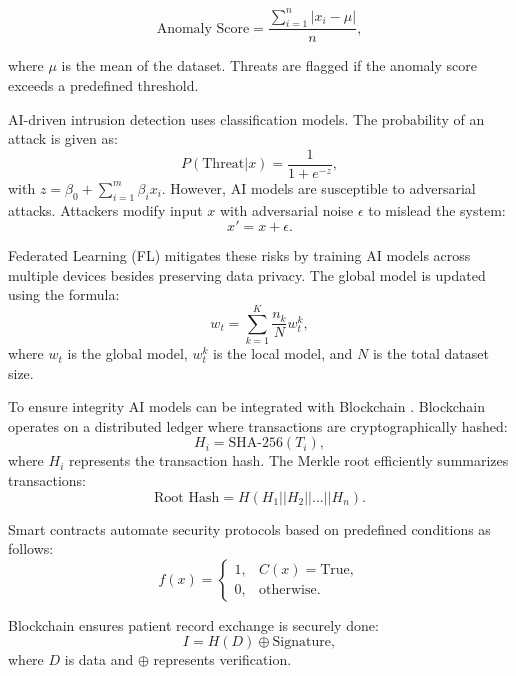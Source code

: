 \documentclass[pdflatex,sn-mathphys-num]{sn-jnl}
\theoremstyle{thmstyleone}%
\theoremstyle{thmstyletwo}%
\theoremstyle{thmstylethree}%
\begin{document}
\begin{equation}
\text{Anomaly Score} = \frac{\sum_{i=1}^n |x_i - \mu|}{n}, 
\end{equation}


where \(\mu\) is the mean of the dataset. Threats are flagged if the anomaly score exceeds a predefined threshold.

AI-driven intrusion detection uses classification models. The probability of an attack is given as:
\begin{equation}
P(\text{Threat} | x) = \frac{1}{1 + e^{-z}}, 
\end{equation}
with \(z = \beta_0 + \sum_{i=1}^m \beta_i x_i\). However, AI models are susceptible to adversarial attacks. Attackers modify input \(x\) with adversarial noise \(\epsilon\) to mislead the system:
\begin{equation}
x' = x + \epsilon.
\end{equation}

Federated Learning (FL) mitigates these risks by training AI models across multiple devices besides preserving data privacy\cite{bib9}. The global model is updated using the formula:
\begin{equation}
w_t = \sum_{k=1}^K \frac{n_k}{N} w_t^k, 
\end{equation}
where \(w_t\) is the global model, \(w_t^k\) is the local model, and \(N\) is the total dataset size.

To ensure integrity AI models can be integrated with Blockchain \cite{bib6}. Blockchain operates on a distributed ledger where transactions are cryptographically hashed\cite{bib7}:
\begin{equation}
H_i = \text{SHA-256}(T_i), 
\end{equation}
where \(H_i\) represents the transaction hash. The Merkle root efficiently summarizes transactions\cite{bib7}:
\begin{equation}
\text{Root Hash} = H(H_1 || H_2 || \ldots || H_n).
\end{equation}

Smart contracts automate security protocols based on predefined conditions as follows:
\begin{equation}
f(x) = 
\begin{cases} 
1, & C(x) = \text{True}, \\
0, & \text{otherwise}.
\end{cases}
\end{equation}

Blockchain ensures patient record exchange is securely done:
\begin{equation}
I = H(D) \oplus \text{Signature},
\end{equation}
where \(D\) is data and \(\oplus\) represents verification.
\end{document}
